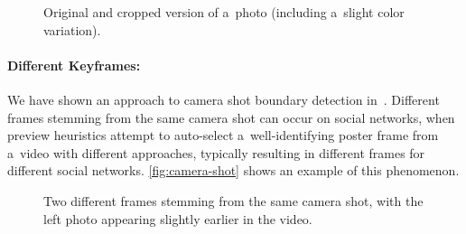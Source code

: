 \begin{figure}[!ht]
  \centering
  \caption[Original and cropped version of a~photo]
  {Original and cropped version of a~photo (including a~slight color variation).}
  \label{fig:cropping}  
\end{figure}

\paragraph{Different Keyframes:}

We have shown an approach to camera shot boundary detection in~\cite{steiner2012shotdetection}.
Different frames stemming from the same camera shot
can occur on social networks, when preview heuristics
attempt to auto-select a~well-identifying poster frame from a~video with different approaches,
typically resulting in different frames for different social networks.
\autoref{fig:camera-shot} shows an example of this phenomenon.

\begin{figure}[!ht]
  \centering
  \caption[Two different frames stemming from the same camera shot]
    {Two different frames stemming from the same camera shot,
    with the left photo appearing slightly earlier in the video.}
  \label{fig:camera-shot}  
\end{figure}

